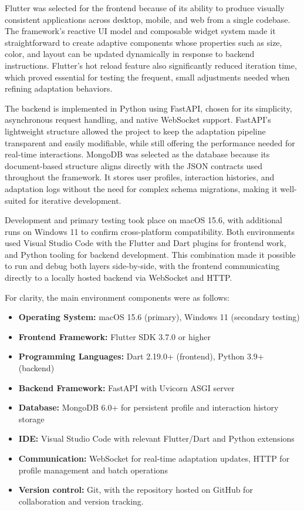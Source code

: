 \documentclass[openany]{book}
\begin{document}
Flutter was selected for the frontend because of its ability to produce visually consistent applications across desktop, mobile, and web from a single codebase. The framework’s reactive UI model and composable widget system made it straightforward to create adaptive components whose properties such as size, color, and layout can be updated dynamically in response to backend instructions. Flutter’s hot reload feature also significantly reduced iteration time, which proved essential for testing the frequent, small adjustments needed when refining adaptation behaviors.

The backend is implemented in Python using FastAPI, chosen for its simplicity, asynchronous request handling, and native WebSocket support. FastAPI’s lightweight structure allowed the project to keep the adaptation pipeline transparent and easily modifiable, while still offering the performance needed for real-time interactions. MongoDB was selected as the database because its document-based structure aligns directly with the JSON contracts used throughout the framework. It stores user profiles, interaction histories, and adaptation logs without the need for complex schema migrations, making it well-suited for iterative development.

Development and primary testing took place on macOS 15.6, with additional runs on Windows 11 to confirm cross-platform compatibility. Both environments used Visual Studio Code with the Flutter and Dart plugins for frontend work, and Python tooling for backend development. This combination made it possible to run and debug both layers side-by-side, with the frontend communicating directly to a locally hosted backend via WebSocket and HTTP.

For clarity, the main environment components were as follows:
\begin{itemize}
    \item \textbf{Operating System:} macOS 15.6 (primary), Windows 11 (secondary testing)
    \item \textbf{Frontend Framework:} Flutter SDK 3.7.0 or higher
    \item \textbf{Programming Languages:} Dart 2.19.0+ (frontend), Python 3.9+ (backend)
    \item \textbf{Backend Framework:} FastAPI with Uvicorn ASGI server
    \item \textbf{Database:} MongoDB 6.0+ for persistent profile and interaction history storage
    \item \textbf{IDE:} Visual Studio Code with relevant Flutter/Dart and Python extensions
    \item \textbf{Communication:} WebSocket for real-time adaptation updates, HTTP for profile management and batch operations
    \item \textbf{Version control:} Git, with the repository hosted on GitHub for collaboration and version tracking.
\end{itemize}
\end{document}
